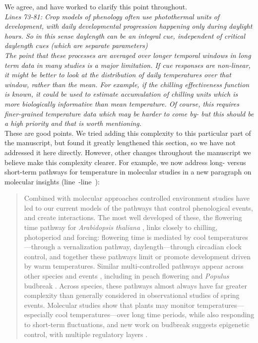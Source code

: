 \documentclass[11pt,letter]{article}
\newcommand{\lr}[1]{line~\lineref{#1}}
\begin{document}
We agree, and have worked to clarify this point throughout.\\

\emph{Lines 73-81: Crop models of phenology often use photothermal units of development, with daily developmental progression happening only during daylight hours.  So in this sense daylength can be an integral cue, independent of critical daylength cues (which are separate parameters)}\\

\emph{The point that these processes are averaged over longer temporal windows in long term data in many studies is a major limitation.  If cue responses are non-linear, it might be better to look at the distribution of daily temperatures over that window, rather than the mean.  For example, if the chilling effectiveness function is known, it could be used to estimate accumulation of chilling units which is more biologically informative than mean temperature. Of course, this requires finer-grained temperature data which may be harder to come by- but this should be a high priority and that is worth mentioning. }\\

These are good points. We tried adding this complexity to this particular part of the manuscript, but found it greatly lengthened this section, so we have not addressed it here directly. However, other changes throughout the manuscript we believe make this complexity clearer. For example, we now address long- versus short-term pathways for temperature in molecular studies in a new paragraph on molecular insights (\lr{newparaonmolecstart}-\lr{newparaonmolecend}):
\begin{quote}
Combined with molecular approaches controlled environment studies have led to our current models of the pathways that control phenological events, and create interactions. The most well developed of these, the flowering time pathway for \emph{Arabidopsis thaliana} \citep[reviewed in][]{Satake2022}, links closely to chilling, photoperiod and forcing: flowering time is mediated by cool temperatures---through a vernalization pathway, daylength---through circadian clock control, and together these pathways limit or promote development driven by warm temperatures. Similar multi-controlled pathways appear across other species and events \citep{Maurya2017,Satake2022}, including in peach flowering and \emph{Populus} budbreak \citep{Azeez2021}. Across species, these pathways almost always have far greater complexity than generally considered in observational studies of spring events. Molecular studies show that plants may monitor temperatures---especially cool temperatures---over long time periods, while also responding to short-term fluctuations, and new work on budbreak suggests epigenetic control, with multiple regulatory layers \citep{Azeez2021}.
\end{quote}
\end{document}
